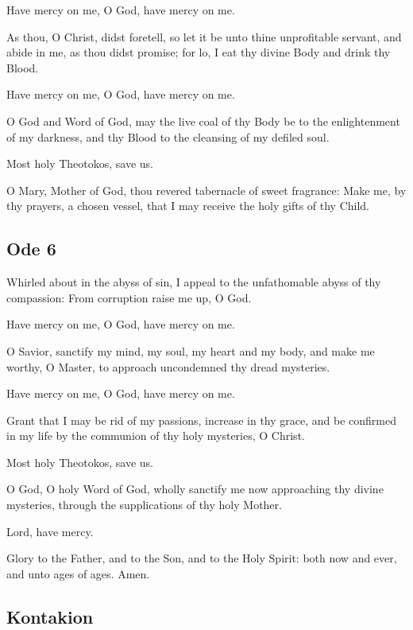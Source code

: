 \hspace{1em} Have mercy on me, O God, have mercy on me.

As thou, O Christ, didst foretell, so let it be unto thine unprofitable servant, and abide in me, as thou didst promise; for lo, I eat thy divine Body and drink thy Blood.

\hspace{1em} Have mercy on me, O God, have mercy on me.

O God and Word of God, may the live coal of thy Body be to the enlightenment of my darkness, and thy Blood to the cleansing of my defiled soul.

\hspace{1em} Most holy Theotokos, save us.

O Mary, Mother of God, thou revered tabernacle of sweet fragrance: Make me, by thy prayers, a chosen vessel, that I may receive the holy gifts of thy Child.

\subsection{Ode 6}

 Whirled about in the abyss of sin, I appeal to the unfathomable abyss of thy compassion: From corruption raise me up, O God.

\hspace{1em} Have mercy on me, O God, have mercy on me.

O Savior, sanctify my mind, my soul, my heart and my body, and make me worthy, O Master, to approach uncondemned thy dread mysteries.

\hspace{1em} Have mercy on me, O God, have mercy on me.

Grant that I may be rid of my passions, increase in thy grace, and be confirmed in my life by the communion of thy holy mysteries, O Christ.

\hspace{1em} Most holy Theotokos, save us.

O God, O holy Word of God, wholly sanctify me now approaching thy divine mysteries, through the supplications of thy holy Mother.

Lord, have mercy. 

Glory to the Father, and to the Son, and to the Holy Spirit: both now and ever, and unto ages of ages. Amen.

\subsection{Kontakion}

